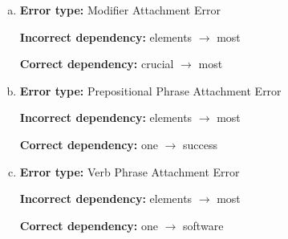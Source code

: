 \begin{enumerate}[1.]
\begin{enumerate}[(a)]
\item {\bf Error type:} Modifier Attachment Error 

{\bf Incorrect dependency:} elements $\rightarrow$ most 

{\bf Correct dependency:} crucial $\rightarrow$ most

\item {\bf Error type:} Prepositional Phrase Attachment Error

{\bf Incorrect dependency:} elements $\rightarrow$ most

{\bf Correct dependency:} one $\rightarrow$ success

\item {\bf Error type:} Verb Phrase Attachment Error

{\bf Incorrect dependency:} elements $\rightarrow$ most

{\bf Correct dependency:} one $\rightarrow$ software

\end{enumerate}


\end{enumerate}